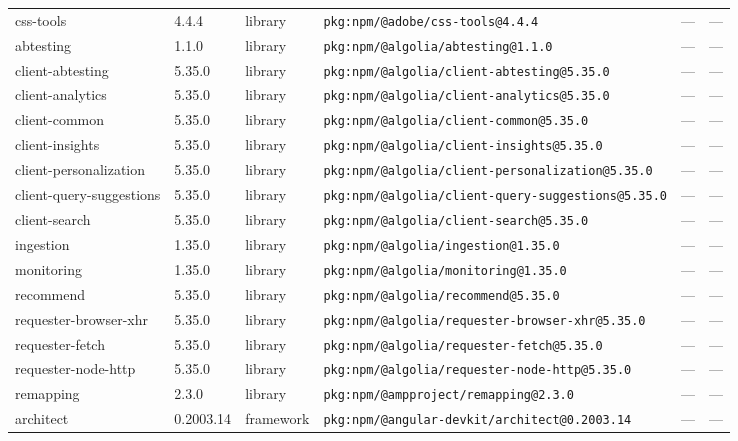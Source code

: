 \documentclass[11pt,a4paper]{article}
\begin{document}
\begin{longtable}{|p{4cm}|p{2cm}|p{1.6cm}|p{5cm}|p{1.5cm}|p{3.5cm}|}
\raggedright css-tools & 4.4.4 & library & \small\texttt{pkg:npm/@adobe/css-tools@4.4.4} & — & \small — \\
\raggedright abtesting & 1.1.0 & library & \small\texttt{pkg:npm/@algolia/abtesting@1.1.0} & — & \small — \\
\raggedright client-abtesting & 5.35.0 & library & \small\texttt{pkg:npm/@algolia/client-abtesting@5.35.0} & — & \small — \\
\raggedright client-analytics & 5.35.0 & library & \small\texttt{pkg:npm/@algolia/client-analytics@5.35.0} & — & \small — \\
\raggedright client-common & 5.35.0 & library & \small\texttt{pkg:npm/@algolia/client-common@5.35.0} & — & \small — \\
\raggedright client-insights & 5.35.0 & library & \small\texttt{pkg:npm/@algolia/client-insights@5.35.0} & — & \small — \\
\raggedright client-personalization & 5.35.0 & library & \small\texttt{pkg:npm/@algolia/client-personalization@5.35.0} & — & \small — \\
\raggedright client-query-suggestions & 5.35.0 & library & \small\texttt{pkg:npm/@algolia/client-query-suggestions@5.35.0} & — & \small — \\
\raggedright client-search & 5.35.0 & library & \small\texttt{pkg:npm/@algolia/client-search@5.35.0} & — & \small — \\
\raggedright ingestion & 1.35.0 & library & \small\texttt{pkg:npm/@algolia/ingestion@1.35.0} & — & \small — \\
\raggedright monitoring & 1.35.0 & library & \small\texttt{pkg:npm/@algolia/monitoring@1.35.0} & — & \small — \\
\raggedright recommend & 5.35.0 & library & \small\texttt{pkg:npm/@algolia/recommend@5.35.0} & — & \small — \\
\raggedright requester-browser-xhr & 5.35.0 & library & \small\texttt{pkg:npm/@algolia/requester-browser-xhr@5.35.0} & — & \small — \\
\raggedright requester-fetch & 5.35.0 & library & \small\texttt{pkg:npm/@algolia/requester-fetch@5.35.0} & — & \small — \\
\raggedright requester-node-http & 5.35.0 & library & \small\texttt{pkg:npm/@algolia/requester-node-http@5.35.0} & — & \small — \\
\raggedright remapping & 2.3.0 & library & \small\texttt{pkg:npm/@ampproject/remapping@2.3.0} & — & \small — \\
\raggedright architect & 0.2003.14 & framework & \small\texttt{pkg:npm/@angular-devkit/architect@0.2003.14} & — & \small — \\

\end{longtable}
\end{document}
